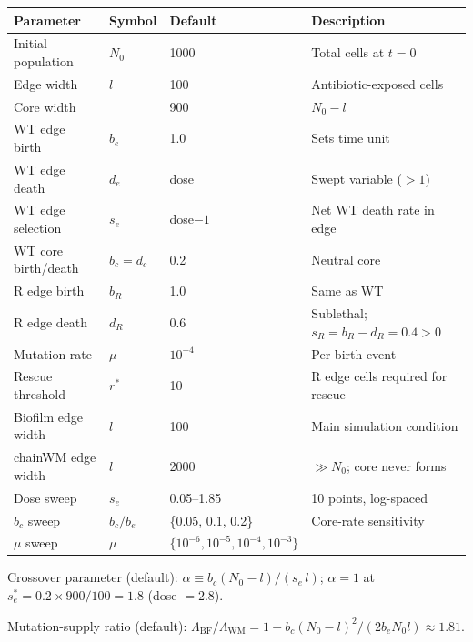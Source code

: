 \documentclass[12pt]{article}
\begin{document}
\begin{center}
\renewcommand{\arraystretch}{1.4}
\begin{tabular}{llll}
\toprule
Parameter & Symbol & Default & Description \\
\midrule
Initial population  & $N_0$   & 1000 & Total cells at $t=0$ \\
Edge width          & $l$     & 100  & Antibiotic-exposed cells \\
Core width          &         & 900  & $N_0 - l$ \\
WT edge birth       & $b_e$   & 1.0  & Sets time unit \\
WT edge death       & $d_e$   & dose & Swept variable ($> 1$) \\
WT edge selection   & $s_e$   & dose$-1$ & Net WT death rate in edge \\
WT core birth/death & $b_c = d_c$ & 0.2 & Neutral core \\
R edge birth        & $b_R$   & 1.0  & Same as WT \\
R edge death        & $d_R$   & 0.6  & Sublethal; $s_R = b_R - d_R = 0.4 > 0$ \\
Mutation rate       & $\mu$   & $10^{-4}$ & Per birth event \\
Rescue threshold    & $r^*$   & 10   & R edge cells required for rescue \\
\midrule
Biofilm edge width  & $l$     & 100  & Main simulation condition \\
chainWM edge width  & $l$     & 2000 & $\gg N_0$; core never forms \\
\midrule
Dose sweep          & $s_e$   & 0.05--1.85 & 10 points, log-spaced \\
$b_c$ sweep         & $b_c/b_e$ & \{0.05, 0.1, 0.2\} & Core-rate sensitivity \\
$\mu$ sweep         & $\mu$   & $\{10^{-6}, 10^{-5}, 10^{-4}, 10^{-3}\}$ & \\
\bottomrule
\end{tabular}
\end{center}

\noindent Crossover parameter (default):
$\alpha \equiv b_c(N_0 - l)/(s_e\, l)$;
$\alpha = 1$ at $s_e^* = 0.2 \times 900/100 = 1.8$ (dose $= 2.8$).

\noindent Mutation-supply ratio (default):
$\Lambda_{\text{BF}}/\Lambda_{\text{WM}} = 1 + b_c(N_0-l)^2/(2b_e N_0 l) \approx 1.81$.




\end{document}
